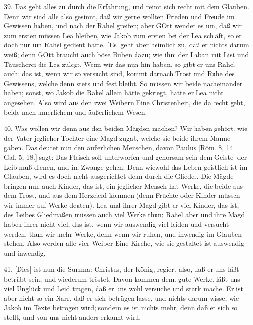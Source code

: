 39. Das geht alles zu durch die Erfahrung, und reimt sich recht mit dem Glauben. Denn wir sind alle also gesinnt, daß wir gerne wollten Frieden und Freude im Gewissen haben, und nach der Rahel greifen; aber GOtt wendet es um, daß wir zum ersten müssen Lea bleiben, wie Jakob zum ersten bei der Lea schläft, so er doch nur um Rahel gedient hatte. [Es] geht aber heimlich zu, daß er nichts darum weiß; denn GOtt braucht auch böse Buben dazu; wie ihm der Laban mit List und Täuscherei die Lea zulegt. Wenn wir das nun hin haben, so gibt er uns Rahel auch; das ist, wenn wir so versucht sind, kommt darnach Trost und Ruhe des Gewissens, welche denn stets und fest bleibt. So müssen wir beide nacheinander haben; sonst, wo Jakob die Rahel allein hätte gekriegt, hätte er Lea nicht angesehen. Also wird aus den zwei Weibern Eine Christenheit, die da recht geht, beide nach innerlichem und äußerlichem Wesen.

40. Was wollen wir denn aus den beiden Mägden machen? Wir haben gehört, wie der Vater jeglicher Tochter eine Magd zugab, welche sie beide ihrem Manne gaben. Das deutet nun
den äußerlichen Menschen, davon Paulus [Röm. 8, 14. Gal. 5, 18.] sagt: Das Fleisch soll unterworfen und gehorsam sein dem Geiste; der Leib muß dienen, und im Zwange gehen. Denn wiewohl das Leben geistlich ist im Glauben, wird es doch nicht ausgerichtet denn durch die Glieder. Die Mägde bringen nun auch Kinder, das ist, ein jeglicher Mensch hat Werke, die beide aus dem Trost, und aus dem Herzeleid kommen (denn Früchte oder Kinder müssen wir immer auf Werke deuten). Lea und ihrer Magd gibt er viel Kinder, das ist, des Leibes Gliedmaßen müssen auch viel Werke thun; Rahel aber und ihre Magd haben ihrer nicht viel, das ist, wenn wir auswendig viel leiden und versucht werden, thun wir mehr Werke, denn wenn wir ruhen, und inwendig im Glauben stehen. Also werden alle vier Weiber Eine Kirche, wie sie gestaltet ist auswendig und inwendig.

41. [Dies] ist nun die Summa: Christus, der König, regiert also, daß er uns läßt betrübt sein, und wiederum tröstet. Davon kommen denn gute Werke, läßt uns viel Unglück und Leid tragen, daß er uns wohl versuche und stark mache. Er ist aber nicht so ein Narr, daß er sich betrügen lasse, und nichts darum wisse, wie Jakob im Texte betrogen wird; sondern es ist nichts mehr, denn daß er sich so stellt, und von uns nicht anders erkannt wird.

